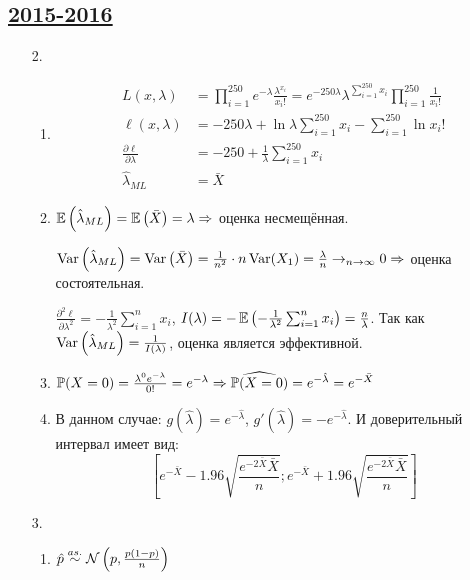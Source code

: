 \subsection[2015-2016]{\hyperref[sec:kr_04_2015_2016]{2015-2016}}
\label{sec:sol_kr_04_2015_2016}

\begin{enumerate}
\item[2.]
\begin{enumerate}
\item
\begin{align*}
  L(x, \lambda) &= \prod_{i=1}^{250} e^{-\lambda} \frac{\lambda^{x_i}}{x_i!} = e^{-250\lambda} \lambda^{\sum_{i=1}^{250} x_i} \prod_{i=1}^{250} \frac{1}{x_i!} \\
  \ell(x, \lambda) &= -250\lambda + \ln\lambda \sum_{i=1}^{250} x_i - \sum_{i=1}^{250} \ln x_i! \\
  \frac{\partial \ell}{\partial \lambda} &= -250 + \frac{1}{\lambda} \sum_{i=1}^{250} x_i \\
  \hat{\lambda}_{ML} &= \bar{X}
\end{align*}
\item $\E\left(\hat{\lambda}_{ML}\right) = \E\left(\bar{X}\right) = \lambda \Rightarrow$ оценка несмещённая.

$\Var\left(\hat{\lambda}_{ML}\right) = \Var\left(\bar{X}\right) = \frac{1}{n^2}\cdot n\Var(X_1) = \frac{\lambda}{n} \to_{n \to \infty} 0 \Rightarrow$ оценка состоятельная.

$\frac{\partial^2 \ell}{\partial \lambda^2} = -\frac{1}{\lambda^2} \sum_{i=1}^{n} x_i$,
$I(\lambda) = - \E\left(-\frac{1}{\lambda^2} \sum_{i=1}^{n} x_i\right) = \frac{n}{\lambda}$.
Так как $\Var\left(\hat{\lambda}_{ML}\right) = \frac{1}{I(\lambda)}$, оценка является эффективной.
\item $\P(X=0) = \frac{\lambda^0 e^{-\lambda}}{0!} = e^{-\lambda} \Rightarrow \widehat{\P(X=0)} = e^{-\hat\lambda} = e^{-\bar{X}}$
\item В данном случае: $g\left(\hat{\lambda}\right) = e^{-\hat\lambda}$, $g'\left(\hat\lambda\right) = -e^{-\hat\lambda}$.
И доверительный интервал имеет вид:
\[
  \left[e^{-\bar{X}} - 1.96 \sqrt{\frac{e^{-2\bar{X}}\bar{X}}{n}}; e^{-\bar{X}} + 1.96 \sqrt{\frac{e^{-2\bar{X}}\bar{X}}{n}} \right]
\]
\end{enumerate}


\item[3.]
\begin{enumerate}
\item $\hat p \stackrel{as.}{\sim}\cN\left(p, \frac{p(1-p)}{n}\right)$


\end{enumerate}
\end{enumerate}
